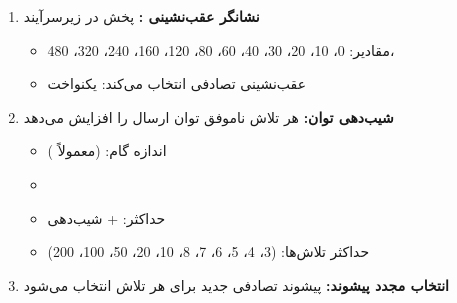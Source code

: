 \begin{enumerate}
\def\labelenumi{\arabic{enumi}.}
\tightlist
\item
  \textbf{نشانگر عقب‌نشینی :} پخش در زیرسرآیند 

  \begin{itemize}
  \tightlist
  \item
    مقادیر: 0، 10، 20، 30، 40، 60، 80، 120، 160، 240، 320، 480، 
  \item
     عقب‌نشینی تصادفی انتخاب می‌کند: یکنواخت \lr{\mbox{[0, BI]}}
  \end{itemize}
\item
  \textbf{شیب‌دهی توان:} هر تلاش ناموفق توان ارسال را افزایش می‌دهد

  \begin{itemize}
  \tightlist
  \item
    اندازه گام:  (معمولاً )
  \item
  \item
    حداکثر:  + شیب‌دهی
  \item
    حداکثر تلاش‌ها:  (3، 4، 5، 6، 7، 8، 10، 20، 50، 100، 200)
  \end{itemize}
\item
  \textbf{انتخاب مجدد پیشوند:} پیشوند تصادفی جدید برای هر تلاش انتخاب می‌شود
\end{enumerate}







\CNchained{}

